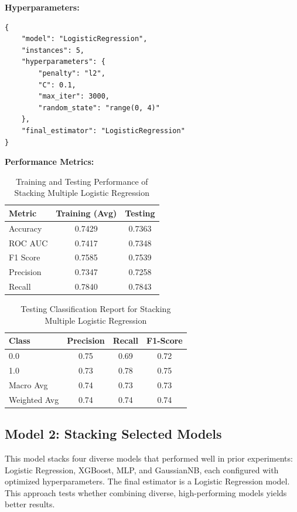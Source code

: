 \textbf{Hyperparameters:}
\begin{verbatim}
{
    "model": "LogisticRegression",
    "instances": 5,
    "hyperparameters": {
        "penalty": "l2",
        "C": 0.1,
        "max_iter": 3000,
        "random_state": "range(0, 4)"
    },
    "final_estimator": "LogisticRegression"
}
\end{verbatim}

\textbf{Performance Metrics:}
\begin{table}[H]
\centering
\caption{Training and Testing Performance of Stacking Multiple Logistic Regression}
\begin{tabular}{|l|c|c|}
\hline
\textbf{Metric} & \textbf{Training (Avg)} & \textbf{Testing} \\ \hline
Accuracy & 0.7429 & 0.7363 \\ \hline
ROC AUC & 0.7417 & 0.7348 \\ \hline
F1 Score & 0.7585 & 0.7539 \\ \hline
Precision & 0.7347 & 0.7258 \\ \hline
Recall & 0.7840 & 0.7843 \\ \hline
\end{tabular}
\end{table}

\begin{table}[H]
\centering
\caption{Testing Classification Report for Stacking Multiple Logistic Regression}
\begin{tabular}{|l|c|c|c|}
\hline
\textbf{Class} & \textbf{Precision} & \textbf{Recall} & \textbf{F1-Score} \\ \hline
0.0 & 0.75 & 0.69 & 0.72 \\ \hline
1.0 & 0.73 & 0.78 & 0.75 \\ \hline
Macro Avg & 0.74 & 0.73 & 0.73 \\ \hline
Weighted Avg & 0.74 & 0.74 & 0.74 \\ \hline
\end{tabular}
\end{table}

\subsection{Model 2: Stacking Selected Models}
This model stacks four diverse models that performed well in prior experiments: Logistic Regression, XGBoost, MLP, and GaussianNB, each configured with optimized hyperparameters. The final estimator is a Logistic Regression model. This approach tests whether combining diverse, high-performing models yields better results.

